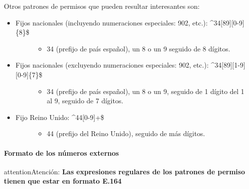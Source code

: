 \documentclass[letterpaper,10pt,spanish]{sphinxmanual}
\begin{document}
Otros patrones de permisos que pueden resultar interesantes son:
\begin{itemize}
\item {} \begin{description}
\item[{Fijos nacionales (incluyendo numeraciones especiales: 902, etc.): \textasciicircum{}34{[}89{]}{[}0-9{]}\{8\}\$}] \leavevmode\begin{itemize}
\item {} 
34 (prefijo de país español), un 8 o un 9 seguido de 8 dígitos.

\end{itemize}

\end{description}

\item {} \begin{description}
\item[{Fijos nacionales (excluyendo numeraciones especiales: 902, etc.): \textasciicircum{}34{[}89{]}{[}1-9{]}{[}0-9{]}\{7\}\$}] \leavevmode\begin{itemize}
\item {} 
34 (prefijo de país español), un 8 o un 9, seguido de 1 dígito del 1 al 9, seguido de 7 dígitos.

\end{itemize}

\end{description}

\item {} \begin{description}
\item[{Fijo Reino Unido: \textasciicircum{}44{[}0-9{]}+\$}] \leavevmode\begin{itemize}
\item {} 
44 (prefijo del Reino Unido), seguido de más dígitos.

\end{itemize}

\end{description}

\end{itemize}
\paragraph{Formato de los números externos}

\begin{notice}{attention}{Atención:}
\textbf{Las expresiones regulares de los patrones de permiso tienen que estar en formato E.164}
\end{notice}
\end{document}
